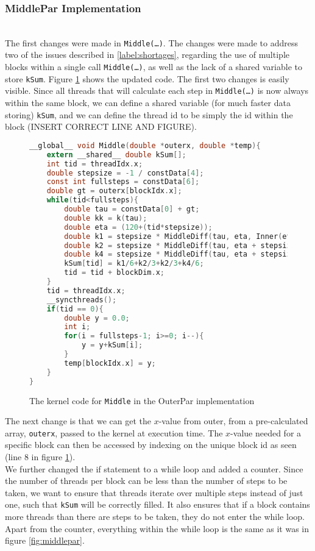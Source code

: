 \subsubsection{MiddlePar Implementation} \hfill \\
The first changes were made in \texttt{Middle(…)}. The changes were made to address two of the issues described in \ref{label:shortages}, regarding the use of multiple blocks within a single call \texttt{Middle(…)}, as well as the lack of a shared variable to store \texttt{kSum}. Figure \ref{fig:outerpar} shows the updated code. The first two changes is easily  visible. Since all threads that will calculate each step in \texttt{Middle(…)} is now always within the same block, we can define a shared variable (for much faster data storing) \texttt{kSum}, and we can define the thread id to be simply the id within the block (INSERT CORRECT LINE AND FIGURE).\\

\begin{figure}[ht]
\begin{lstlisting}[language=c]
__global__ void Middle(double *outerx, double *temp){
	extern __shared__ double kSum[];
	int tid = threadIdx.x;
	double stepsize = -1 / constData[4];
	const int fullsteps = constData[6];
	double gt = outerx[blockIdx.x];
	while(tid<fullsteps){
		double tau = constData[0] + gt;
		double kk = k(tau);
		double eta = (120+(tid*stepsize));
		double k1 = stepsize * MiddleDiff(tau, eta, Inner(eta, gt, kk).y);
		double k2 = stepsize * MiddleDiff(tau, eta + stepsize/2, Inner(eta + stepsize/2, gt, kk).y);		
		double k4 = stepsize * MiddleDiff(tau, eta + stepsize, Inner(eta + stepsize, gt, kk).y);
		kSum[tid] = k1/6+k2/3+k2/3+k4/6;
		tid = tid + blockDim.x;
	}
	tid = threadIdx.x;
	__syncthreads();
	if(tid == 0){
		double y = 0.0;
		int i;
		for(i = fullsteps-1; i>=0; i--){
			y = y+kSum[i];
		}
		temp[blockIdx.x] = y;
	}
}
\end{lstlisting}
\caption{The kernel code for \texttt{Middle} in the OuterPar implementation}
\label{fig:outerpar}
\end{figure}

The next change is that we can get the $x$-value from outer, from a pre-calculated array, \texttt{outerx}, passed to the kernel at execution time. The $x$-value needed for a specific block can then be accessed by indexing on the unique block id as seen (line 8 in figure \ref{fig:outerpar}).\\

We further changed the if statement to a while loop and added a counter. Since the number of threads per block can be less than the number of steps to be taken, we want to ensure that threads iterate over multiple steps instead of just one, such that \texttt{kSum} will be correctly filled. It also ensures that if a block contains more threads than there are steps to be taken, they do not enter the while loop. Apart from the counter, everything within the while loop is the same as it was in figure \ref{fig:middlepar}.\\

